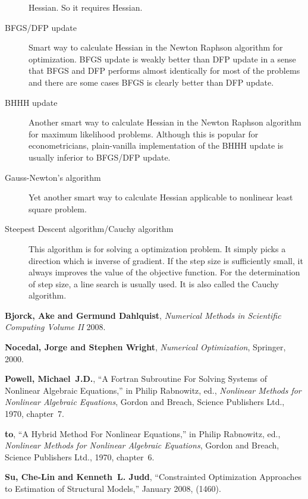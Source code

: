 \documentclass[12pt]{article}
\begin{document}
\begin{description}
      Hessian. So it requires Hessian.
    \item[BFGS/DFP update] Smart way to calculate Hessian in the Newton Raphson algorithm for
      optimization. BFGS update is weakly better than DFP update in a sense that BFGS and DFP
      performs almost identically for most of the problems and there are some cases BFGS is
      clearly better than DFP update.  
    \item[BHHH update] Another smart way to calculate Hessian in the Newton Raphson algorithm for
      maximum likelihood problems. Although this is popular for econometricians, plain-vanilla
      implementation of the BHHH update is usually inferior to BFGS/DFP update. 
    \item[Gauss-Newton's algorithm] Yet another smart way to calculate Hessian applicable to
      nonlinear least square problem.
    \item[Steepest Descent algorithm/Cauchy algorithm] This algorithm is for solving a
      optimization problem. It simply picks a direction which is inverse of gradient. If the step size
      is sufficiently small, it always improves the value of the objective function. For the
      determination of step size, a line search is usually used. It is also called the Cauchy
      algorithm.
\end{description}




\ifx\undefined\bysame
\newcommand{\bysame}{\leavevmode\hbox to\leftmargin{\hrulefill\,\,}}
\fi
\begin{thebibliography}{xx}

{\bf Bjorck, Ake and Germund Dahlquist}, {\it Numerical Methods in Scientific
  Computing Volume II} 2008.

{\bf Nocedal, Jorge and Stephen Wright}, {\it Numerical Optimization},
  Springer, 2000.

{\bf Powell, Michael~J.D.}, ``A Fortran Subroutine For Solving Systems of
  Nonlinear Algebraic Equations,'' in Philip Rabnowitz, ed., {\it Nonlinear
  Methods for Nonlinear Algebraic Equations}, Gordon and Breach, Science
  Publishers Ltd., 1970, chapter~7.

{\bf \bysame{}}, ``A Hybrid Method For Nonlinear Equations,'' in Philip
  Rabnowitz, ed., {\it Nonlinear Methods for Nonlinear Algebraic Equations},
  Gordon and Breach, Science Publishers Ltd., 1970, chapter~6.

{\bf Su, Che-Lin and Kenneth~L. Judd}, ``Constrainted Optimization Approaches
  to Estimation of Structural Models,'' January 2008, (1460).

\end{thebibliography}
\end{document}
